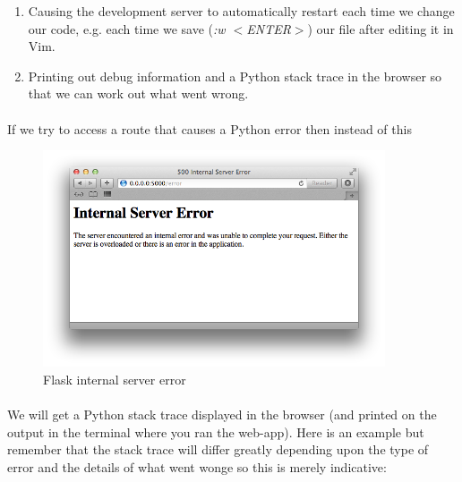 \documentclass[12pt, a4paper, twoside]{book}
\begin{document}
\begin{enumerate}
\item Causing the development server to automatically restart each time we change our code, e.g. each time we save (\emph{:w $<$ENTER$>$}) our file after editing it in Vim.
\item Printing out debug information and a Python stack trace in the browser so that we can work out what went wrong.
\end{enumerate}

\paragraph{} If we try to access a route that causes a Python error then instead of this

\begin{figure}[H]
\centering
\includegraphics[width=0.9\textwidth]{images/flask-internal-server-error.png}
\caption{Flask internal server error}
\label{fig:flask-internal-server-error}
\end{figure}
 \paragraph{} We will get a Python stack trace displayed in the browser (and printed on the output in the terminal where you ran the web-app). Here is an example but remember that the stack trace will differ greatly depending upon the type of error and the details of what went wonge so this is merely indicative:
\end{document}
